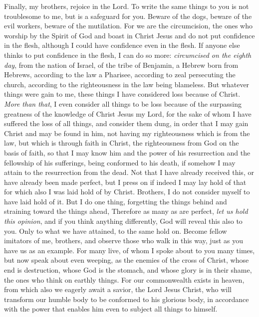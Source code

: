 \begin{biblechapter} %
 Finally, my brothers, rejoice in the Lord. To write the same things to you is not troublesome to me, but is a safeguard for you.
\verse Beware of the dogs, beware of the evil workers, beware of the mutilation.
\verse For we are the circumcision, the ones who worship by the Spirit of God and boast in Christ Jesus and do not put confidence in the flesh,
\verse although I could have confidence even in the flesh.
 If anyone else thinks to put confidence in the flesh, I can do so more:
\verse \textit{circumcised on the eighth day}, from the nation of Israel, of the tribe of Benjamin, a Hebrew born from Hebrews, according to the law a Pharisee,
\verse according to zeal persecuting the church, according to the righteousness in the law being blameless.
\verse But whatever things were gain to me, these things I have considered loss because of Christ.
\verse \textit{More than that}, I even consider all things to be loss because of the surpassing greatness of the knowledge of Christ Jesus my Lord, for the sake of whom I have suffered the loss of all things, and consider them dung, in order that I may gain Christ
\verse and may be found in him, not having my righteousness which is from the law, but which is through faith in Christ, the righteousness from God on the basis of faith,
\verse so that I may know him and the power of his resurrection and the fellowship of his sufferings, being conformed to his death,
\verse if somehow I may attain to the resurrection from the dead.
\verse Not that I have already received this, or have already been made perfect, but I press on if indeed I may lay hold of that for which also I was laid hold of by Christ.
\verse Brothers, I do not consider myself to have laid hold of it. But I do one thing, forgetting the things behind and straining toward the things ahead,
 Therefore as many as are perfect, \textit{let us hold this opinion}, and if you think anything differently, God will reveal this also to you.
\verse Only to what we have attained, to the same hold on.
\verse Become fellow imitators of me, brothers, and observe those who walk in this way, just as you have us as an example.
\verse For many live, of whom I spoke about to you many times, but now speak about even weeping, as the enemies of the cross of Christ,
\verse whose end is destruction, whose God is the stomach, and whose glory is in their shame, the ones who think on earthly things.
\verse For our commonwealth exists in heaven, from which also we eagerly await a savior, the Lord Jesus Christ,
\verse who will transform our humble body to be conformed to his glorious body, in accordance with the power that enables him even to subject all things to himself.
\end{biblechapter}

